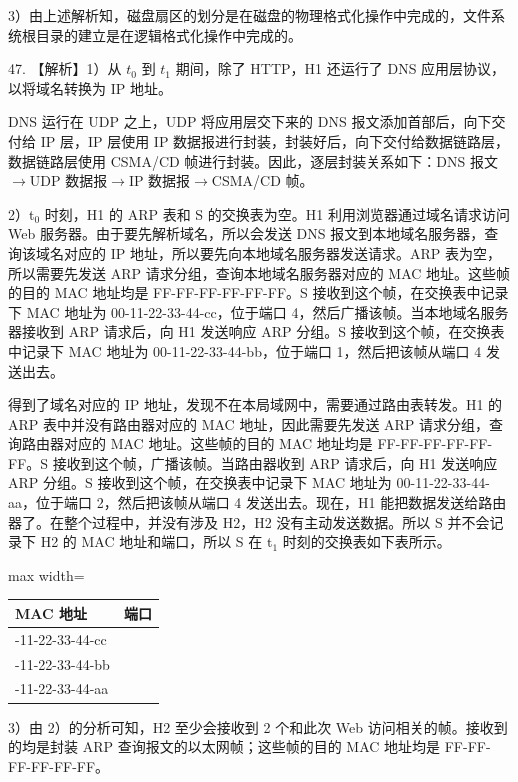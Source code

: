 \documentclass[UTF8,11pt]{ctexart}
\begin{document}
3）由上述解析知，磁盘扇区的划分是在磁盘的物理格式化操作中完成的，文件系统根目录的建立是在逻辑格式化操作中完成的。


47. 【解析】1）从 \(\displaystyle t_0\) 到 \(\displaystyle t_1\) 期间，除了 HTTP，H1 还运行了 DNS 应用层协议，以将域名转换为 IP 地址。


DNS 运行在 UDP 之上，UDP 将应用层交下来的 DNS 报文添加首部后，向下交付给 IP 层，IP 层使用 IP 数据报进行封装，封装好后，向下交付给数据链路层，数据链路层使用 CSMA/CD 帧进行封装。因此，逐层封装关系如下：DNS 报文\(\displaystyle \rightarrow\)UDP 数据报\(\displaystyle \rightarrow\)IP 数据报\(\displaystyle \rightarrow\)CSMA/CD 帧。


2）t\(\displaystyle _0\) 时刻，H1 的 ARP 表和 S 的交换表为空。H1 利用浏览器通过域名请求访问 Web 服务器。由于要先解析域名，所以会发送 DNS 报文到本地域名服务器，查询该域名对应的 IP 地址，所以要先向本地域名服务器发送请求。ARP 表为空，所以需要先发送 ARP 请求分组，查询本地域名服务器对应的 MAC 地址。这些帧的目的 MAC 地址均是 FF-FF-FF-FF-FF-FF。S 接收到这个帧，在交换表中记录下 MAC 地址为 00-11-22-33-44-cc，位于端口 4，然后广播该帧。当本地域名服务器接收到 ARP 请求后，向 H1 发送响应 ARP 分组。S 接收到这个帧，在交换表中记录下 MAC 地址为 00-11-22-33-44-bb，位于端口 1，然后把该帧从端口 4 发送出去。


得到了域名对应的 IP 地址，发现不在本局域网中，需要通过路由表转发。H1 的 ARP 表中并没有路由器对应的 MAC 地址，因此需要先发送 ARP 请求分组，查询路由器对应的 MAC 地址。这些帧的目的 MAC 地址均是 FF-FF-FF-FF-FF-FF。S 接收到这个帧，广播该帧。当路由器收到 ARP 请求后，向 H1 发送响应 ARP 分组。S 接收到这个帧，在交换表中记录下 MAC 地址为 00-11-22-33-44-aa，位于端口 2，然后把该帧从端口 4 发送出去。现在，H1 能把数据发送给路由器了。在整个过程中，并没有涉及 H2，H2 没有主动发送数据。所以 S 并不会记录下 H2 的 MAC 地址和端口，所以 S 在 t\(\displaystyle _1\) 时刻的交换表如下表所示。


\begin{center}\begin{adjustbox}{max width=\linewidth}\begin{tabular}{|>{\raggedright\arraybackslash}p{\dimexpr(\linewidth-4\tabcolsep-3\arrayrulewidth)/2\relax}|>{\raggedright\arraybackslash}p{\dimexpr(\linewidth-4\tabcolsep-3\arrayrulewidth)/2\relax}|}\hline
MAC 地址 & 端口\\\hline
00-11-22-33-44-cc & 4\\\hline
00-11-22-33-44-bb & 1\\\hline
00-11-22-33-44-aa & 2\\\hline\end{tabular}\end{adjustbox}\end{center}

3）由 2）的分析可知，H2 至少会接收到 2 个和此次 Web 访问相关的帧。接收到的均是封装 ARP 查询报文的以太网帧；这些帧的目的 MAC 地址均是 FF-FF-FF-FF-FF-FF。
\end{document}
